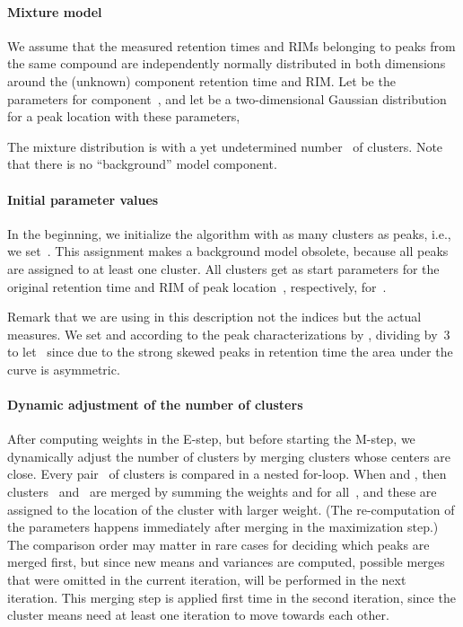 \documentclass{article}
\begin{document}
\paragraph{Mixture model}
We assume that the measured retention times and RIMs belonging to peaks from the same compound are independently normally distributed in both dimensions around the (unknown) component retention time and RIM.
Let  be the parameters for component~, and let  be a two-dimensional Gaussian distribution for a peak location  with these parameters,

The mixture distribution is  with a yet undetermined number~ of clusters.
Note that there is no ``background'' model component.

\paragraph*{Initial parameter values}
In the beginning, we initialize the algorithm with as many clusters as peaks, i.e., we set~.
This assignment makes a background model obsolete, because all peaks are assigned to at least one cluster.
All clusters get as start parameters for  the original retention time and  RIM of peak location~, respectively, for~.

Remark that we are using in this description not the indices but the actual measures.
We set  and  according to the peak characterizations by \cite{bodeker2008peak}, dividing by~3 to let~ since due to the strong skewed peaks in retention time the area under the curve is asymmetric.

\paragraph*{Dynamic adjustment of the number of clusters}
After computing weights in the E-step, but before starting the M-step, we dynamically adjust the number of clusters by merging clusters whose centers are close.
Every pair~ of clusters is compared in a nested for-loop.
When  and , then clusters~ and~ are merged by summing the weights  and  for all~, and these are assigned to the location of the cluster with larger weight.
(The re-computation of the parameters happens immediately after merging in the maximization step.)
The comparison order may matter in rare cases for deciding which peaks are merged first, but since new means and variances are computed, possible merges that were omitted in the current iteration, will be performed in the next iteration.
This merging step is applied first time in the second iteration, since the cluster means need at least one iteration to move towards each other.
\end{document}
